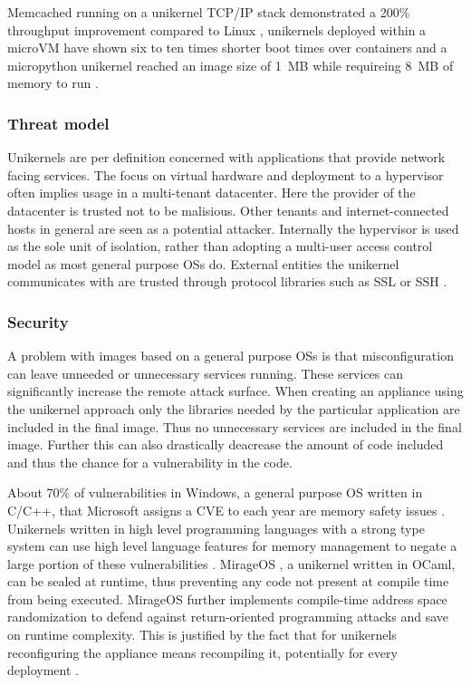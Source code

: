 \documentclass[10pt,twocolumn,a4paper]{article}
\begin{document}
      Memcached running on a unikernel TCP/IP stack
      demonstrated a 200\% throughput improvement compared to Linux \cite{schatzberg16},
      unikernels deployed within a microVM have shown six to ten times shorter
      boot times over containers \cite{koller17} and a micropython unikernel reached an image
      size of 1~MB while requireing 8~MB of memory to run \cite{manco17}.

    \subsubsection{Threat model}\label{sec:thread-model}
      Unikernels are per definition concerned with applications that provide network
      facing services. 
      The focus on virtual hardware and deployment to a hypervisor
      often implies usage in a multi-tenant datacenter.
      Here the provider of the datacenter is trusted not to be malisious.
      Other tenants and internet-connected hosts in general are seen as 
      a potential attacker.
      Internally the hypervisor is used as the sole unit of isolation, 
      rather than adopting a multi-user access control model as most general purpose OSs do.
      External entities the unikernel communicates with are trusted through
      protocol libraries such as SSL or SSH \cite{madhavapeddy13}.

    \subsubsection{Security}
      A problem with images based on a general purpose OSs is that misconfiguration can
      leave unneeded or unnecessary services running. 
      These services can significantly increase the remote attack surface.
      When creating an appliance using the unikernel approach only the libraries
      needed by the particular application are included in the final image.
      Thus no unnecessary services are included in the final image.
      Further this can also drastically deacrease the amount of code included and thus the chance
      for a vulnerability in the code.
      
      About 70\% of vulnerabilities in Windows, a general purpose OS written in C/C++,
      that Microsoft assigns a CVE to each year are memory safety issues \cite{msrc-19-07}.
      Unikernels written in high level programming languages with a strong type system 
      can use high level language features for memory management to negate a large
      portion of these vulnerabilities \cite{madhavapeddy13, lankes19}.
      MirageOS \cite{madhavapeddy13}, a unikernel written in OCaml, can be sealed \cite{hunt07} at runtime,
      thus preventing any code not present at compile time from being executed.
      MirageOS further implements compile-time address space randomization to defend against
      return-oriented programming attacks and save on runtime complexity.
      This is justified by the fact that for unikernels reconfiguring the appliance 
      means recompiling it, potentially for every deployment \cite{madhavapeddy13}.
\end{document}
